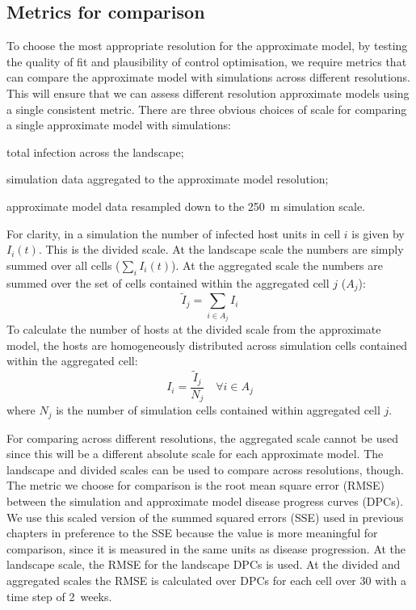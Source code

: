 \subsection{Metrics for comparison}

To choose the most appropriate resolution for the approximate model, by testing the quality of fit and plausibility of control optimisation, we require metrics that can compare the approximate model with simulations across different resolutions. This will ensure that we can assess different resolution approximate models using a single consistent metric. There are three obvious choices of scale for comparing a single approximate model with simulations:
\begin{description}
    \setlength{\itemsep}{3pt}%
    \setlength{\parskip}{3pt}%
    \setlength{\parsep}{3pt}%
    \item[Landscape scale:] total infection across the landscape;
    \item[Aggregated scale:] simulation data aggregated to the approximate model resolution;
    \item[Divided scale:] approximate model data resampled down to the \SI{250}{\meter} simulation scale.
\end{description}

For clarity, in a simulation the number of infected host units in cell $i$ is given by $I_i(t)$. This is the divided scale. At the landscape scale the numbers are simply summed over all cells ($\sum_iI_i(t)$). At the aggregated scale the numbers are summed over the set of cells contained within the aggregated cell $j$ ($A_j$):
\begin{equation}
    \tilde{I}_j = \sum_{i\in{}A_j}I_i
\end{equation}
To calculate the number of hosts at the divided scale from the approximate model, the hosts are homogeneously distributed across simulation cells contained within the aggregated cell:
\begin{equation}
    I_i = \frac{\tilde{I}_j}{N_j} \quad \forall i \in A_j
\end{equation}
where $N_j$ is the number of simulation cells contained within aggregated cell $j$.

For comparing across different resolutions, the aggregated scale cannot be used since this will be a different absolute scale for each approximate model. The landscape and divided scales can be used to compare across resolutions, though. The metric we choose for comparison is the root mean square error (RMSE) between the simulation and approximate model disease progress curves (DPCs). We use this scaled version of the summed squared errors (SSE) used in previous chapters in preference to the SSE because the value is more meaningful for comparison, since it is measured in the same units as disease progression. At the landscape scale, the RMSE for the landscape DPCs is used. At the divided and aggregated scales the RMSE is calculated over DPCs for each cell over \SI{30}{\years} with a time step of 2~weeks.

